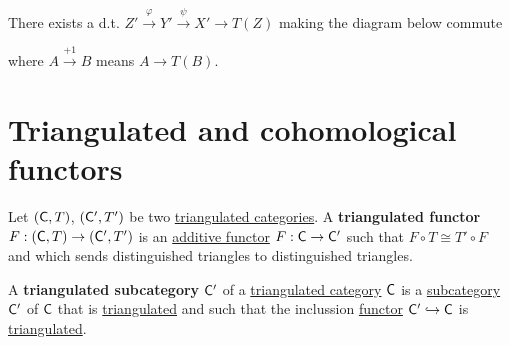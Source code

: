 \documentclass[../../main]{subfiles}
\begin{document}
\begin{definition}
\begin{enumerate}[start=0, label=Tr.\arabic*), ref=Tr.\arabic*]
\begin{center}
          \end{center}
          There exists a d.t. \(Z' \xrightarrow{\varphi} Y' \xrightarrow{\psi} X' \to T(Z)\) making the diagram below commute
          \begin{center}
          \end{center}
          where \(A \xrightarrow{+1} B\) means \(A \to T(B)\).
  \end{enumerate}
\end{definition}

\section{Triangulated and cohomological functors}

\begin{definition}\label{def:triangulated-functor}
  Let \((\mathsf{C}, T)\), \((\mathsf{C'}, T')\) be two \hyperref[def:triangulated-category]{triangulated categories}.
  A \textbf{triangulated functor} \(F: (\mathsf{C}, T) \to (\mathsf{C'}, T')\) is an \hyperref[def:additive-functor]{additive functor} \(F: \mathsf{C} \to \mathsf{C'}\) such that \(F \circ T \cong T' \circ F\) and which sends distinguished triangles to distinguished triangles.
\end{definition}

\begin{definition}\label{def:triangulated-subcategory}
  A \textbf{triangulated subcategory} \(\mathsf{C'}\) of a \hyperref[def:triangulated-category]{triangulated category} \(\mathsf{C}\) is a \hyperref[def:subcategory]{subcategory} \(\mathsf{C'}\) of  \(\mathsf{C}\) that is \hyperref[def:triangulated-subcategory]{triangulated} and such that the inclussion \hyperref[def:functor]{functor} \(\mathsf{C'} \hookrightarrow \mathsf{C}\) is \hyperref[def:triangulated-functor]{triangulated}.
\end{definition}
\end{document}
